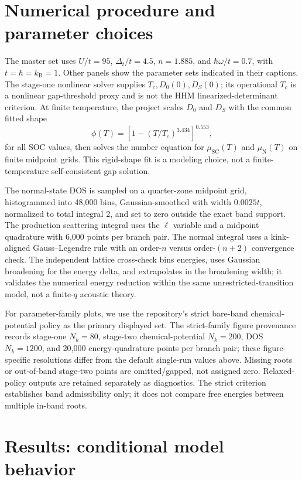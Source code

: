 \documentclass[aps,prb,preprint,superscriptaddress]{revtex4-2}
\newcommand{\kb}{k_{\mathrm B}}
\begin{document}
\section{Numerical procedure and parameter choices}

The master set uses $U/t=95$, $\Delta_t/t=4.5$, $n=1.885$, and $\hbar\omega/t=0.7$, with $t=\hbar=\kb=1$. Other panels show the parameter sets indicated in their captions. The stage-one nonlinear solver supplies $T_c,D_0(0),D_S(0)$; its operational $T_c$ is a nonlinear gap-threshold proxy and is not the HHM linearized-determinant criterion. At finite temperature, the project scales $D_0$ and $D_S$ with the common fitted shape
\begin{equation}
 \phi(T)=\left[1-(T/T_c)^{3.434}\right]^{0.553},
 \label{eq:gap-fit}
\end{equation}
for all SOC values, then solves the number equation for $\mu_{\mathrm{SC}}(T)$ and $\mu_{\mathrm N}(T)$ on finite midpoint grids. This rigid-shape fit is a modeling choice, not a finite-temperature self-consistent gap solution.

The normal-state DOS is sampled on a quarter-zone midpoint grid, histogrammed into 48,000 bins, Gaussian-smoothed with width $0.0025t$, normalized to total integral 2, and set to zero outside the exact band support. The production scattering integral uses the $\ell$ variable and a midpoint quadrature with 6,000 points per branch pair. The normal integral uses a kink-aligned Gauss--Legendre rule with an order-$n$ versus order-$(n+2)$ convergence check. The independent lattice cross-check bins energies, uses Gaussian broadening for the energy delta, and extrapolates in the broadening width; it validates the numerical energy reduction within the same unrestricted-transition model, not a finite-$q$ acoustic theory.

For parameter-family plots, we use the repository's strict bare-band chemical-potential policy as the primary displayed set. The strict-family figure provenance records stage-one $N_k=80$, stage-two chemical-potential $N_k=200$, DOS $N_k=1200$, and 20{,}000 energy-quadrature points per branch pair; these figure-specific resolutions differ from the default single-run values above. Missing roots or out-of-band stage-two points are omitted/gapped, not assigned zero. Relaxed-policy outputs are retained separately as diagnostics. The strict criterion establishes band admissibility only; it does not compare free energies between multiple in-band roots.

\section{Results: conditional model behavior}
\end{document}
